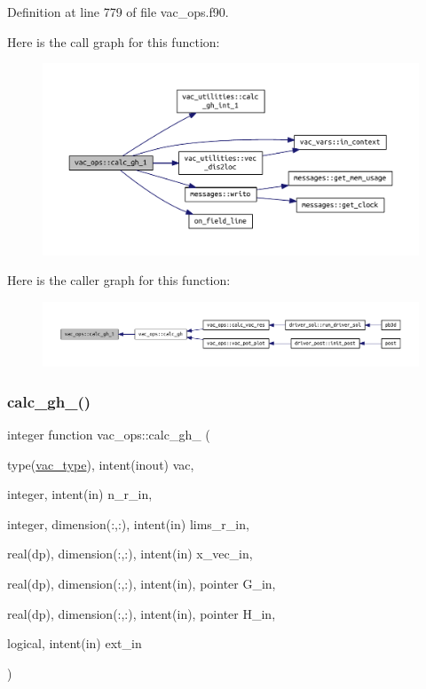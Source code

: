 Definition at line 779 of file vac\+\_\+ops.\+f90.

Here is the call graph for this function\+:\nopagebreak
\begin{figure}[H]
\begin{center}
\leavevmode
\includegraphics[width=350pt]{namespacevac__ops_a267742c3c9a1b395aee76527d1e8352c_cgraph}
\end{center}
\end{figure}
Here is the caller graph for this function\+:\nopagebreak
\begin{figure}[H]
\begin{center}
\leavevmode
\includegraphics[width=350pt]{namespacevac__ops_a267742c3c9a1b395aee76527d1e8352c_icgraph}
\end{center}
\end{figure}
\mbox{\label{namespacevac__ops_ae4987d1f48f1f83b1f0d38ea85b4998b}} 
\subsubsection{\texorpdfstring{calc\+\_\+gh\+\_()}{calc\_gh\_2()}}
{\footnotesize\ttfamily integer function vac\+\_\+ops\+::calc\+\_\+gh\+\_ (\begin{DoxyParamCaption}\item[{type(\hyperlink{structvac__vars_1_1vac__type}{vac\+\_\+type}), intent(inout)}]{vac,  }\item[{integer, intent(in)}]{n\+\_\+r\+\_\+in,  }\item[{integer, dimension(\+:,\+:), intent(in)}]{lims\+\_\+r\+\_\+in,  }\item[{real(dp), dimension(\+:,\+:), intent(in)}]{x\+\_\+vec\+\_\+in,  }\item[{real(dp), dimension(\+:,\+:), intent(in), pointer}]{G\+\_\+in,  }\item[{real(dp), dimension(\+:,\+:), intent(in), pointer}]{H\+\_\+in,  }\item[{logical, intent(in)}]{ext\+\_\+in }\end{DoxyParamCaption})}



